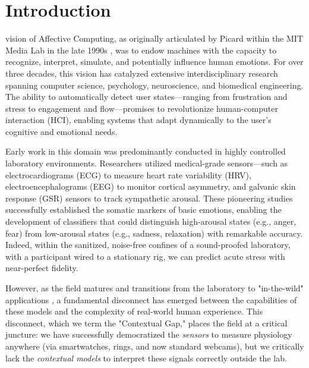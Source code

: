 \documentclass[journal]{IEEEtran}
\begin{document}
\section{Introduction}

 vision of Affective Computing, as originally articulated by Picard within the MIT Media Lab in the late 1990s \cite{picard_affective_computing}, 
was to endow machines with the capacity to recognize, interpret, simulate, and potentially influence human emotions. 
For over three decades, this vision has catalyzed extensive interdisciplinary research spanning computer science, psychology, 
neuroscience, and biomedical engineering. The ability to automatically detect user states—ranging from frustration and stress 
to engagement and flow—promises to revolutionize human-computer interaction (HCI), enabling systems that adapt dynamically 
to the user's cognitive and emotional needs.

Early work in this domain was predominantly conducted in highly controlled laboratory environments. 
Researchers utilized medical-grade sensors—such as electrocardiograms (ECG) to measure heart rate variability (HRV), 
electroencephalograms (EEG) to monitor cortical asymmetry, and galvanic skin response (GSR) sensors to track sympathetic arousal. 
These pioneering studies successfully established the somatic markers of basic emotions, enabling the development of classifiers 
that could distinguish high-arousal states (e.g., anger, fear) from low-arousal states (e.g., sadness, relaxation) with remarkable accuracy. 
Indeed, within the sanitized, noise-free confines of a sound-proofed laboratory, with a participant wired to a stationary rig, 
we can predict acute stress with near-perfect fidelity.

However, as the field matures and transitions from the laboratory to "in-the-wild" applications \cite{ambulatory_assessment}, 
a fundamental disconnect has emerged between the capabilities of these models and the complexity of real-world human experience. 
This disconnect, which we term the "Contextual Gap," places the field at a critical juncture: we have successfully democratized 
the \textit{sensors} to measure physiology anywhere (via smartwatches, rings, and now standard webcams), 
but we critically lack the \textit{contextual models} to interpret these signals correctly outside the lab.
\end{document}
